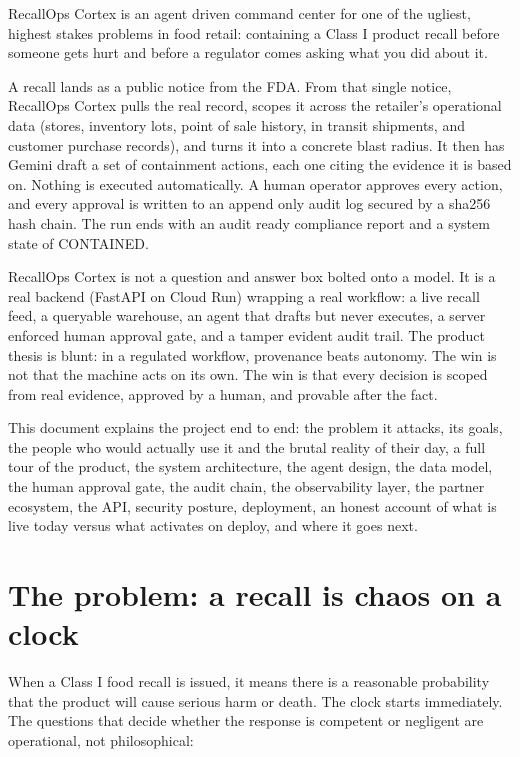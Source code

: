 \documentclass[11pt]{article}
\begin{document}
RecallOps Cortex is an agent driven command center for one of the ugliest, highest stakes
problems in food retail: containing a Class I product recall before someone gets hurt and
before a regulator comes asking what you did about it.

A recall lands as a public notice from the FDA. From that single notice, RecallOps Cortex pulls
the real record, scopes it across the retailer's operational data (stores, inventory lots, point
of sale history, in transit shipments, and customer purchase records), and turns it into a
concrete blast radius. It then has Gemini draft a set of containment actions, each one citing the
evidence it is based on. Nothing is executed automatically. A human operator approves every action,
and every approval is written to an append only audit log secured by a sha256 hash chain. The run
ends with an audit ready compliance report and a system state of CONTAINED.

\begin{factbox}
RecallOps Cortex is not a question and answer box bolted onto a model. It is a real backend
(FastAPI on Cloud Run) wrapping a real workflow: a live recall feed, a queryable warehouse, an
agent that drafts but never executes, a server enforced human approval gate, and a tamper evident
audit trail. The product thesis is blunt: in a regulated workflow, provenance beats autonomy. The
win is not that the machine acts on its own. The win is that every decision is scoped from real
evidence, approved by a human, and provable after the fact.
\end{factbox}

This document explains the project end to end: the problem it attacks, its goals, the people who
would actually use it and the brutal reality of their day, a full tour of the product, the system
architecture, the agent design, the data model, the human approval gate, the audit chain, the
observability layer, the partner ecosystem, the API, security posture, deployment, an honest
account of what is live today versus what activates on deploy, and where it goes next.

\section{The problem: a recall is chaos on a clock}

When a Class I food recall is issued, it means there is a reasonable probability that the product
will cause serious harm or death. The clock starts immediately. The questions that decide whether
the response is competent or negligent are operational, not philosophical:
\end{document}
